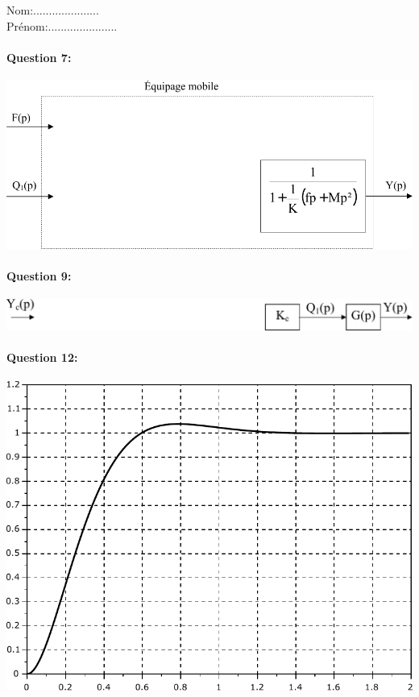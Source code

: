 \newpage
\cleardoublepage

Nom:.....................\\
Prénom:......................

\paragraph{Question 7:}

\begin{center}
 \includegraphics[width=0.8\linewidth]{img/SB1}
\end{center}

\paragraph{Question 9:}

\begin{center}
 \includegraphics[width=0.8\linewidth]{img/SB2}
\end{center}

\vspace{1cm}

\paragraph{Question 12:}

\begin{center}
 \includegraphics[width=0.7\linewidth]{img/courbe}
\end{center}

